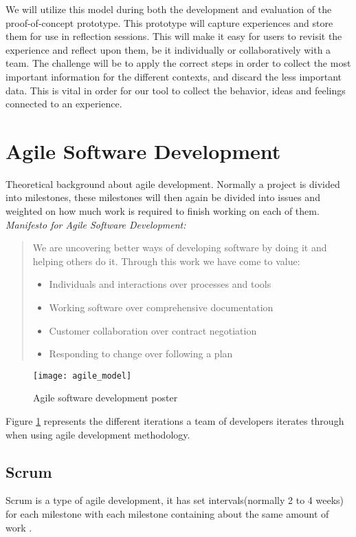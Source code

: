 We will utilize this model during both the development and evaluation of the proof-of-concept prototype. This prototype will capture experiences and store them for use in reflection sessions. This will make it easy for users to revisit the experience and reflect upon them, be it individually or collaboratively with a team. The challenge will be to apply the correct steps in order to collect the most important information for the different contexts, and discard the less important data. This is vital in order for our tool to collect the behavior, ideas and feelings connected to an experience.

\section{Agile Software Development}
Theoretical background about agile development. Normally a project is divided into milestones, these milestones will then again be divided into issues and weighted on how much work is required to finish working on each of them.\linebreak
\emph{Manifesto for Agile Software Development:}\citep{agilemanifesto}
\begin{quotation}
We are uncovering better ways of developing software by doing it and helping others do it. Through this work we have come to value:
\begin{itemize}
\item Individuals and interactions over processes and tools
\item Working software over comprehensive documentation
\item Customer collaboration over contract negotiation
\item Responding to change over following a plan
\end{itemize}
\end{quotation}

\begin{figure}[!htpb]
\centering
	\texttt{[image: agile\_model]}
\caption{Agile software development poster \citep{agilemethodologyposter}}
\label{agileposter}
\end{figure}

Figure \ref{agileposter} represents the different iterations a team of developers iterates through when using agile development methodology.
\clearpage
\subsection{Scrum}
Scrum is a type of agile development, it has set intervals(normally 2 to 4 weeks) for each milestone with each milestone containing about the same amount of work \citep{scrumguide}.

